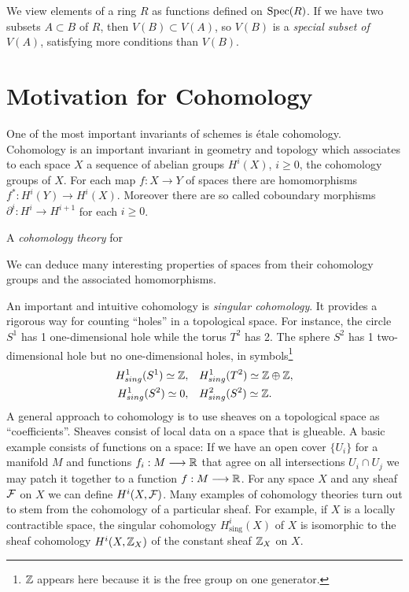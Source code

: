 We view elements of a ring $R$ as functions defined on $\operatorname{Spec}(R)$. If we have two subsets $A \subset B$ of $R$, then $V(B) \subset V(A)$, so $V(B)$ is a \textit{special subset of $V(A)$}, satisfying more conditions than $V(B)$.

\section{Motivation for Cohomology}
One of the most important invariants of schemes is \'etale cohomology.  Cohomology is an important invariant in geometry and topology which associates to each space $X$ a sequence of abelian groups $H^i(X)$, $i \ge 0$, the cohomology groups of $X$. For each map $f: X \to Y$ of spaces there are homomorphisms $f^*: H^i(Y) \to H^i(X)$. Moreover there are so called coboundary morphisms $\partial^i : H^i \to H^{i+1}$ for each $i \ge 0$.
\begin{definition}
	A \textit{cohomology theory} for
\end{definition}
We can deduce many interesting properties of spaces from their cohomology groups and the associated homomorphisms.

An important and intuitive cohomology is \textit{singular cohomology}. It provides a rigorous way for counting ``holes'' in a topological space. For instance, the circle $S^1$ has 1 one-dimensional hole while the torus $T^2$ has 2. The sphere $S^2$ has 1 two-dimensional hole but no one-dimensional holes, in symbols\footnote{$\mathbb{Z}$ appears here because it is the free group on one generator.}
\begin{align*}
	H^1_{sing}(S^1) \simeq \mathbb{Z},\quad & H^1_{sing}(T^2) \simeq \mathbb{Z} \oplus \mathbb{Z}, \\
	H^1_{sing}(S^2) \simeq  0,\quad & H^2_{sing}(S^2) \simeq \mathbb{Z}.
\end{align*}
A general approach to cohomology is to use sheaves on a topological space as ``coefficients''. Sheaves consist of local data on a space that is glueable. A basic example consists of functions on a space: If we have an open cover $\{ U_i\}$ for a manifold $M$ and functions $f_i: M \longrightarrow \mathbb{R}$ that agree on all intersections $U_i \cap U_j$ we may patch it together to a function $f: M \longrightarrow \mathbb{R}$.
For any space $X$ and any sheaf $\mathcal{F}$ on $X$ we can define $H^i(X, \mathcal{F})$. Many examples of cohomology theories turn out to stem from the cohomology of a particular sheaf. For example, if $X$ is a locally contractible space, the singular cohomology $H_{\text{sing}}^i(X)$ of $X$ is isomorphic to the sheaf cohomology $H^i(X, \mathbb{Z}_X)$ of the constant sheaf $\mathbb{Z}_X$ on $X$.

